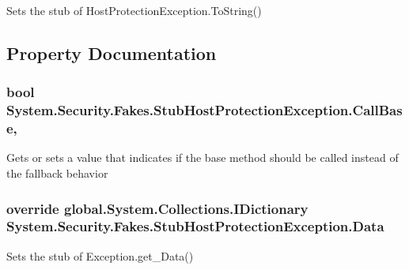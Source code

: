 Sets the stub of Host\-Protection\-Exception.\-To\-String()



\subsection{Property Documentation}
\hypertarget{class_system_1_1_security_1_1_fakes_1_1_stub_host_protection_exception_a5d55461f6a16b354a49601b406390a43}{
\subsubsection[{Call\-Base}]{\setlength{\rightskip}{0pt plus 5cm}bool System.\-Security.\-Fakes.\-Stub\-Host\-Protection\-Exception.\-Call\-Base\hspace{0.3cm}{\ttfamily [get]}, {\ttfamily [set]}}}\label{class_system_1_1_security_1_1_fakes_1_1_stub_host_protection_exception_a5d55461f6a16b354a49601b406390a43}


Gets or sets a value that indicates if the base method should be called instead of the fallback behavior

\hypertarget{class_system_1_1_security_1_1_fakes_1_1_stub_host_protection_exception_aeb5ee3fc3ea16cf8496f90272880129d}{
\subsubsection[{Data}]{\setlength{\rightskip}{0pt plus 5cm}override global.\-System.\-Collections.\-I\-Dictionary System.\-Security.\-Fakes.\-Stub\-Host\-Protection\-Exception.\-Data\hspace{0.3cm}{\ttfamily [get]}}}\label{class_system_1_1_security_1_1_fakes_1_1_stub_host_protection_exception_aeb5ee3fc3ea16cf8496f90272880129d}


Sets the stub of Exception.\-get\-\_\-\-Data()

